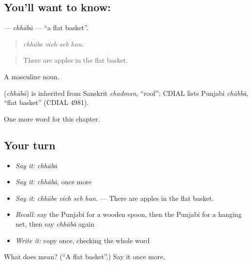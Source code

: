 \subsection*{You'll want to know: }
\textbf{} — \emph{chhābā} — \textquotedblleft{}a flat basket\textquotedblright{}.

\begin{quote}
   
\end{quote}

\begin{quote}
\emph{chhābe vich seb han.}
\end{quote}

\begin{quote}
There are apples in the flat basket.
\end{quote}

A masculine noun.

\begin{cousinweb}
\textbf{} (\emph{chhābā}) is inherited from Sanskrit \emph{chadman}, \textquotedblleft{}roof\textquotedblright{}; CDIAL lists Punjabi \emph{chābbā}, \textquotedblleft{}flat basket\textquotedblright{} (CDIAL 4981).
\end{cousinweb}

\begin{grammarlens}[title={What you've built}]
One more word for this chapter.
\end{grammarlens}

\subsection*{Your turn}
\begin{itemize}
\raggedright
  \item \emph{Say it:} \emph{chhābā}
  \item \emph{Say it:} \emph{chhābā}, once more
  \item \emph{Say it:} \emph{chhābe vich seb han.} — There are apples in the flat basket.
  \item \emph{Recall:} say the Punjabi for a wooden spoon, then the Punjabi for a hanging net, then say \emph{chhābā} again
  \item \emph{Write it:} copy \textbf{} once, checking the whole word
\end{itemize}

\begin{tcolorbox}[breakable,colback=teal!4,colframe=teal!35!black,title={Before you move on}]
What does  mean? (\textquotedblleft{}A flat basket\textquotedblright{}.) Say it once more.
\end{tcolorbox}
